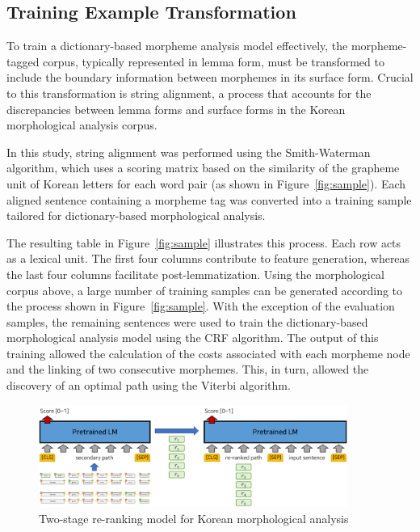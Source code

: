 \documentclass[AMS,STIX2COL]{WileyNJD-v2}
\begin{document}
    \subsection{Training Example Transformation}\label{subsec:training-example-transformation}

    To train a dictionary-based morpheme analysis model effectively, the morpheme-tagged corpus, typically represented in lemma form, must be transformed to include the boundary information between morphemes in its surface form.
    Crucial to this transformation is string alignment, a process that accounts for the discrepancies between lemma forms and surface forms in the Korean morphological analysis corpus.

    In this study, string alignment was performed using the Smith-Waterman algorithm, which uses a scoring matrix based on the similarity of the grapheme unit of Korean letters for each word pair (as shown in Figure~\ref{fig:sample}). Each aligned sentence containing a morpheme tag was converted into a training sample tailored for dictionary-based morphological analysis.

    The resulting table in Figure~\ref{fig:sample} illustrates this process.
    Each row acts as a lexical unit.
    The first four columns contribute to feature generation, whereas the last four columns facilitate post-lemmatization.
    Using the morphological corpus above, a large number of training samples can be generated according to the process shown in Figure~\ref{fig:sample}.
    With the exception of the evaluation samples, the remaining sentences were used to train the dictionary-based morphological analysis model using the CRF algorithm.
    The output of this training allowed the calculation of the costs associated with each morpheme node and the linking of two consecutive morphemes.
    This, in turn, allowed the discovery of an optimal path using the Viterbi algorithm.

    \begin{figure}[t]
        \centerline{\includegraphics[width=0.9\textwidth]{fig3.0}}
        \caption{Two-stage re-ranking model for Korean morphological analysis}
        \label{fig:ranking}
    \end{figure}
\end{document}
